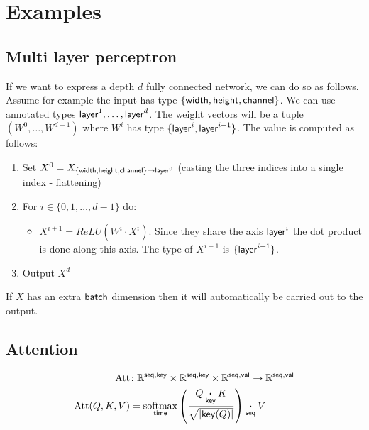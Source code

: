 \documentclass{article}
\begin{document}
\section{Examples}
\label{sec:examples}

\subsection{Multi layer perceptron}

If we want to express a depth $d$ fully connected network, we can do so as follows.
Assume for example the input has type $\{ \name{width}, \name{height} , \name{channel} \}$.
We can use annotated types $\name{layer}^1,\ldots,\name{layer}^d$. 
The weight vectors will be a tuple $(W^0,\ldots,W^{d-1})$ where $W^i$ has type $\{ \name{layer}^{i},\name{layer}^{i+1} \}$.
The value is computed as follows:

\begin{enumerate}

\item Set $X^0 = X_{\{ \name{width}, \name{height} , \name{channel} \} \rightarrow \name{layer}^0 }$ (casting the three indices into a single index - flattening)

\item For $i \in \{0,1,\ldots, d-1\}$ do:


\begin{itemize}
    \item $X^{i+1} = ReLU(W^i \cdot X^i)$. Since they share the axis $\name{layer}^i$ the dot product is done along this axis. The type of $X^{i+1}$ is $\{ \name{layer}^{i+1} \}$.
\end{itemize}

\item Output $X^d$
\end{enumerate}

If $X$ has an extra $\name{batch}$ dimension then it will automatically be carried out to the output.



\subsection{Attention}


\begin{align*}
  \text{Att} &\colon \mathbb{R}^{\name{seq},\name{key}} \times \mathbb{R}^{\name{seq},\name{key}} \times \mathbb{R}^{\name{seq},\name{val}} \rightarrow \mathbb{R}^{\name{seq},\name{val}} \\
  \text{Att}(Q,K,V) &= \nfun{time}{softmax} \left( \frac{Q \ndot{key} K}{\sqrt{|\name{key}(Q)|}} \right) \ndot{seq} V
\end{align*}
\end{document}
